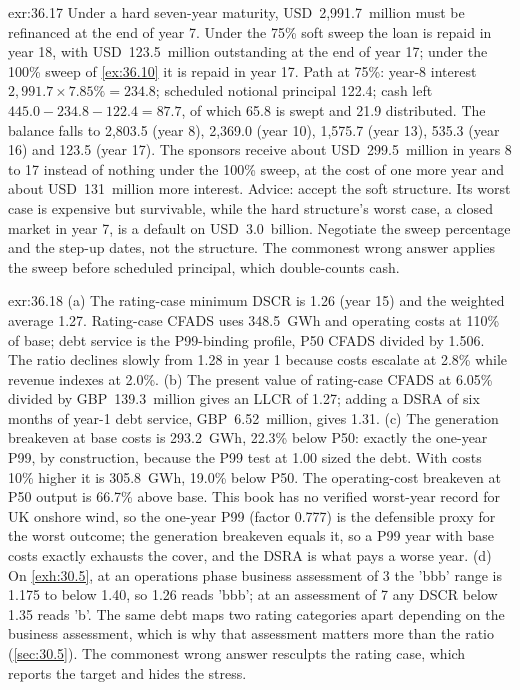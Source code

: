 \begin{solution}{exr:36.17}
Under a hard seven-year maturity, USD~2,991.7~million must be refinanced at the end of year 7. Under the 75\% soft sweep the loan is repaid in year 18, with USD~123.5~million outstanding at the end of year 17; under the 100\% sweep of \cref{ex:36.10} it is repaid in year 17. Path at 75\%: year-8 interest $2{,}991.7 \times 7.85\% = 234.8$; scheduled notional principal 122.4; cash left $445.0 - 234.8 - 122.4 = 87.7$, of which 65.8 is swept and 21.9 distributed. The balance falls to 2,803.5 (year 8), 2,369.0 (year 10), 1,575.7 (year 13), 535.3 (year 16) and 123.5 (year 17). The sponsors receive about USD~299.5~million in years 8 to 17 instead of nothing under the 100\% sweep, at the cost of one more year and about USD~131~million more interest. Advice: accept the soft structure. Its worst case is expensive but survivable, while the hard structure's worst case, a closed market in year 7, is a default on USD~3.0~billion. Negotiate the sweep percentage and the step-up dates, not the structure. The commonest wrong answer applies the sweep before scheduled principal, which double-counts cash.
\end{solution}

\begin{solution}{exr:36.18}
(a) The rating-case minimum DSCR is 1.26\x{} (year 15) and the weighted average 1.27\x. Rating-case CFADS uses 348.5~GWh and operating costs at 110\% of base; debt service is the P99-binding profile, P50 CFADS divided by 1.506. The ratio declines slowly from 1.28\x{} in year 1 because costs escalate at 2.8\% while revenue indexes at 2.0\%. (b) The present value of rating-case CFADS at 6.05\% divided by GBP~139.3~million gives an LLCR of 1.27\x; adding a DSRA of six months of year-1 debt service, GBP~6.52~million, gives 1.31\x. (c) The generation breakeven at base costs is 293.2~GWh, 22.3\% below P50: exactly the one-year P99, by construction, because the P99 test at 1.00\x{} sized the debt. With costs 10\% higher it is 305.8~GWh, 19.0\% below P50. The operating-cost breakeven at P50 output is 66.7\% above base. This book has no verified worst-year record for UK onshore wind, so the one-year P99 (factor 0.777) is the defensible proxy for the worst outcome; the generation breakeven equals it, so a P99 year with base costs exactly exhausts the cover, and the DSRA is what pays a worse year. (d) On \cref{exh:30.5}, at an operations phase business assessment of 3 the 'bbb' range is 1.175\x{} to below 1.40\x, so 1.26\x{} reads 'bbb'; at an assessment of 7 any DSCR below 1.35\x{} reads 'b'. The same debt maps two rating categories apart depending on the business assessment, which is why that assessment matters more than the ratio (\cref{sec:30.5}). The commonest wrong answer resculpts the rating case, which reports the target and hides the stress.
\end{solution}

